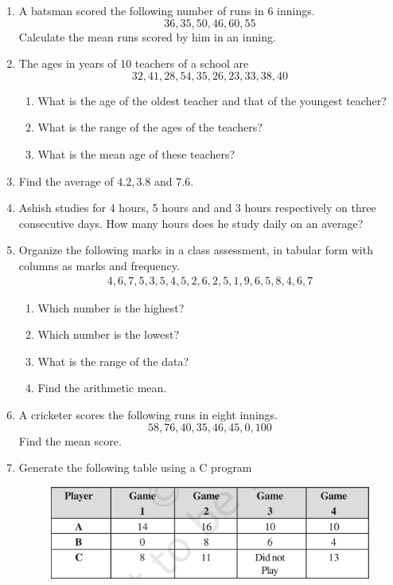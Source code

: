 \begin{enumerate}[label=\thesection.\arabic*, ref=\thesection.\theenumi]
\item A batsman scored the following number of runs in 6 innings.  
	$$36, 35, 50, 46, 60, 55$$
	Calculate the mean runs scored by him in an inning.
	\\
	\solution
	
\item The ages in years of 10 teachers of a school are
	$$32, 41, 28, 54, 35, 26, 23, 33, 38, 40$$
	\begin{enumerate}
		\item What is the age of the oldest teacher and that of the youngest teacher?
			\\
			\solution
	
		\item What is the range of the ages of the teachers?
		\item What is the mean age of these teachers?
	\end{enumerate}
\item Find the average of $4.2, 3.8$ and $7.6$.
\item Ashish studies for 4 hours, 5 hours and and 3 hours respectively on three consecutive days.  How many hours does he study daily on an average?
\item Organize the following marks in a class assessment, in tabular form with columns as marks and frequency.
	\begin{gather}
	4, 6, 7, 5, 3, 5, 4, 5, 2, 6, 2, 5, 1, 9, 6, 5, 8, 4, 6, 7
	\end{gather}
	\begin{enumerate}
		\item Which number is the highest?
		\item Which number is the lowest?
		\item What is the range of the data?
		\item Find the arithmetic mean.
	\end{enumerate}
\item A cricketer scores the following runs in eight innings.
	$$58, 76, 40, 35, 46, 45, 0, 100$$
	Find the mean score.
\item Generate the following table using a C program
	\begin{figure}[H]
  \centering
  \includegraphics[width=\columnwidth]{figs/data.jpg}

\end{figure}
\end{enumerate}
